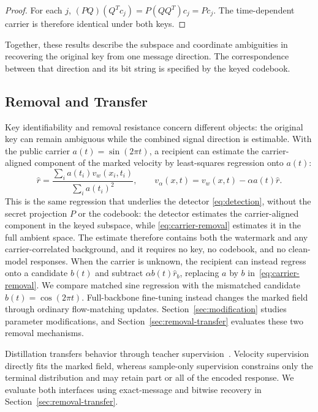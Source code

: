 \documentclass[11pt]{article}
\begin{document}
\begin{proof}
For each $j$, $(P Q)(Q^T c_j)=P(QQ^T)c_j=P c_j$.
The time-dependent carrier is therefore identical under both keys.
\end{proof}

Together, these results describe the subspace and coordinate
ambiguities in recovering the original key from one message direction.
The correspondence between that direction and its bit string is
specified by the keyed codebook.

\subsection{Removal and Transfer}\label{sec:transfer}

Key identifiability and removal resistance concern different objects:
the original key can remain ambiguous while the combined signal
direction is estimable. With the public carrier $a(t)=\sin(2\pi t)$, a recipient can estimate
the carrier-aligned component of the marked velocity by least-squares
regression onto $a(t)$:
\begin{equation}\label{eq:carrier-removal}
\widehat r=\frac{\sum_i a(t_i)v_w(x_i,t_i)}{\sum_i a(t_i)^2},
\qquad v_\alpha(x,t)=v_w(x,t)-\alpha a(t)\widehat r.
\end{equation}
This is the same regression that underlies the detector
\eqref{eq:detection}, without the secret projection $P$ or the
codebook: the detector estimates the carrier-aligned component in the
keyed subspace, while \eqref{eq:carrier-removal} estimates it in the
full ambient space. The estimate therefore contains both the watermark
and any carrier-correlated background, and it requires no key, no
codebook, and no clean-model responses.
When the carrier is unknown, the recipient can instead regress onto a
candidate $b(t)$ and subtract $\alpha b(t)\widehat r_b$, replacing
$a$ by $b$ in~\eqref{eq:carrier-removal}. We compare matched sine
regression with the mismatched candidate $b(t)=\cos(2\pi t)$.
Full-backbone fine-tuning instead changes the marked field through
ordinary flow-matching updates. Section~\ref{sec:modification} studies
parameter modifications, and Section~\ref{sec:removal-transfer} evaluates
these two removal mechanisms.

Distillation transfers behavior through teacher
supervision~\cite{hinton2015distilling}. Velocity supervision directly fits the marked field, whereas sample-only supervision constrains only the terminal distribution and may retain part or all of the encoded response. We evaluate both interfaces using exact-message and bitwise recovery in Section~\ref{sec:removal-transfer}.
\end{document}
